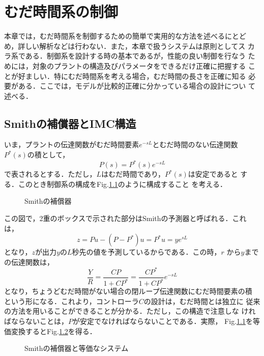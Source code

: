 \chapter{むだ時間系の制御}
本章では，むだ時間系を制御するための簡単で実用的な方法を述べるにとど
め，詳しい解析などは行わない．また，本章で扱うシステムは原則としてス
カラ系である．制御系を設計する時の基本であるが，性能の良い制御を行なう
ためには，対象のプラントの構造及びパラメータをできるだけ正確に把握する
ことが好ましい．特にむだ時間系を考える場合，むだ時間の長さを正確に知る
必要がある．ここでは，モデルが比較的正確に分かっている場合の設計につい
て述べる．
\section{Smithの補償器とIMC構造}
いま，プラントの伝達関数がむだ時間要素$e^{-sL}$とむだ時間のない伝達関数
$P^*(s)$の積として，
\begin{equation}
 P(s) = P^*(s)e^{-sL}
\end{equation}
で表されるとする．ただし，$L$はむだ時間であり，$P^*(s)$は安定であると
する．このとき制御系の構成をFig.\ref{fig_smith}のように構成すること
を考える．
\begin{figure}[htbp]
 \begin{center}
  \caption{Smithの補償器}
  \label{fig_smith}
 \end{center}
\end{figure}

この図で，2重のボックスで示された部分はSmithの予測器と呼ばれる．これは，
\begin{equation}
 z = Pu - (P - P^*)u = P^* u = y e^{sL}
\end{equation}
となり，$z$が出力$y$の$L$秒先の値を予測しているからである．この時，$r$
から$y$までの伝達関数は，
\begin{equation}
 \frac{Y}{R} = \frac{CP}{1 + CP^*} = \frac{C P^*}{1 + CP^*}e^{-sL}
\end{equation}
となり，ちょうどむだ時間がない場合の閉ループ伝達関数にむだ時間要素の積
という形になる．これより，コントローラ$C$の設計は，むだ時間とは独立に
従来の方法を用いることができることが分かる．ただし，この構造で注意しな
ければならないことは，$P$が安定でなければならないことである．実際，
Fig.\ref{fig_smith}を等価変換するとFig.\ref{fig_smith_eqv}を得る．
\begin{figure}[htbp]
 \begin{center}
  \caption{Smithの補償器と等価なシステム}
  \label{fig_smith_eqv}
 \end{center}
\end{figure}

